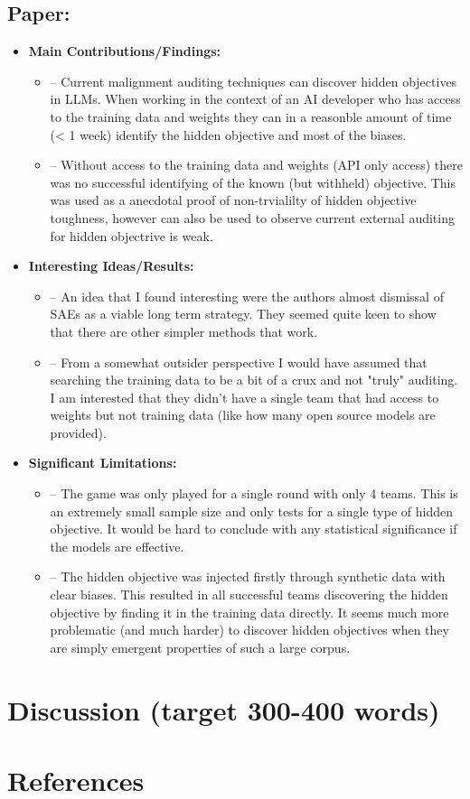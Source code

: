\documentclass{article}[11pt]
\newcommand{\paperdetails}[4]{
\subsection*{Paper: \fullcite{#1}}
\begin{itemize}
    \item \textbf{Main Contributions/Findings:}
    \begin{itemize}
        #2
    \end{itemize}
    \item \textbf{Interesting Ideas/Results:}
    \begin{itemize}
        #3
    \end{itemize}
    \item \textbf{Significant Limitations:}
    \begin{itemize}
        #4
    \end{itemize}
\end{itemize}
}
\begin{document}
\begin{mdframed}[]
\paperdetails{marksAuditingLanguageModels2025}{
    \item [--] Current malignment auditing techniques can discover hidden objectives in LLMs. When working in the context of an AI developer who has access to the training data and weights they can in a reasonble amount of time (< 1 week) identify the hidden objective and most of the biases.
    \item [--] Without access to the training data and weights (API only access) there was no successful identifying of the known (but withheld) objective. This was used as a anecdotal proof of non-trvialilty of hidden objective toughness, however can also be used to observe current external auditing for hidden objectrive is weak.
}{
    \item [--] An idea that I found interesting were the authors almost dismissal of SAEs as a viable long term strategy. They seemed quite keen to show that there are other simpler methods that work.
    \item [--] From a somewhat outsider perspective I would have assumed that searching the training data to be a bit of a crux and not "truly" auditing. I am interested that they didn't have a single team that had access to weights but not training data (like how many open source models are provided).
}{
    \item [--] The game was only played for a single round with only 4 teams. This is an extremely small sample size and only tests for a single type of hidden objective. It would be hard to conclude with any statistical significance if the models are effective. 
    \item [--] The hidden objective was injected firstly through synthetic data with clear biases. This resulted in all successful teams discovering the hidden objective by finding it in the training data directly. It seems much more problematic (and much harder) to discover hidden objectives when they are simply emergent properties of such a large corpus.
}

\end{mdframed}

\section*{Discussion (target 300-400 words)}


\section*{References}
\begin{mdframed}[] %
\printbibliography[heading=none]
\end{mdframed}
\end{document}
